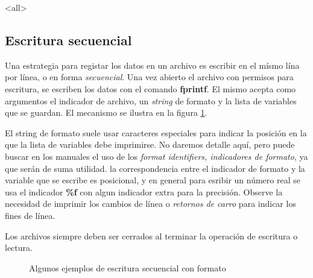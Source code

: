 \mode<all>
\subsection{Escritura secuencial}


Una estrategia para registar los datos en un archivo es 
escribir en el mísmo lína por línea, o en forma \emph{secuencial}.
Una vez abierto el archivo con permisos para escritura, 
se escriben los datos con el comando \textbf{fprintf}. 
El mismo acepta como argumentos el indicador de archivo, 
un \emph{string} de formato y la lista de variables 
que se guardan. El mecanismo se ilustra en la 
figura \ref{FigIOEscribir}.

El string de formato suele usar caracteres especiales para indicar
la posición en la que la lista de variables debe 
imprimirse. No daremos detalle aquí, pero puede
buscar en los manuales el uso de los \emph{format 
identifiers, indicadores de formato}, ya que serán 
de suma utilidad. la correspondencia entre el 
indicador de formato y la variable que se escribe
es posicional, y en general para esribir un número 
real se usa el indicador \textbf{\%f} con algun 
indicador extra para la precisión. 
Observe la necesidad de imprimir los cambios de línea
o \emph{retornos de carro} para indicar los fines de línea. 

Los archivos siempre deben ser cerrados al terminar la operación 
de escritura o lectura. 

\begin{figure}
  \caption{Algunos ejemplos de escritura secuencial con formato\label{FigIOEscribir}}
\end{figure}
\mode*

